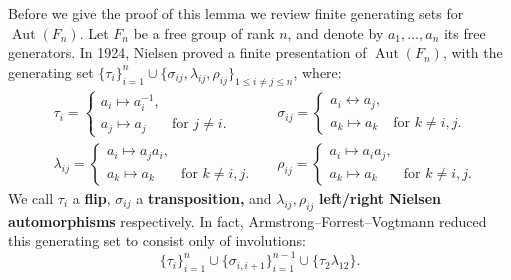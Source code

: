 \documentclass[11pt]{amsart}
\theoremstyle{plain}
\theoremstyle{definition}
\DeclareMathOperator{\Aut}{Aut}
\newcommand{\<}{\langle}
\renewcommand{\>}{\rangle}
\begin{document}
Before we give the proof of this lemma we review finite generating sets for $\Aut(F_{n})$. 
Let $F_n$ be a free group of rank $n$, and denote by $a_1,\ldots,a_n$ its free generators.
In 1924, Nielsen \cite{Nielsen1924} proved a finite presentation of $\Aut(F_n)$, with the
generating set $\{\tau_i\}_{i=1}^n \cup \{\sigma_{ij}, \lambda_{ij},
\rho_{ij}\}_{1 \le i \neq j \le n}$, where:
\begin{align*}
    &\tau_i=
    \begin{cases}
        a_i \mapsto a_i^{-1}, \\
        a_j \mapsto a_j & \text{for $j \neq i$.}
    \end{cases}
    &&\sigma_{ij}=
    \begin{cases}
        a_i \leftrightarrow a_j, \\
        a_k \mapsto a_k &\text{for $k \neq i,j$.}
    \end{cases}\\
    &\lambda_{ij}=
    \begin{cases}
        a_i \mapsto a_ja_i, \\
        a_k \mapsto a_k & \text{for $k \neq i,j$.}
    \end{cases}
    &&\rho_{ij}=
    \begin{cases}
        a_i\mapsto a_ia_j, \\
        a_k \mapsto a_k & \text{for $k \neq i,j$.}
    \end{cases}
\end{align*}
We call $\tau_i$ a \textbf{flip}, $\sigma_{ij}$ a
\textbf{transposition,} and $\lambda_{ij},\rho_{ij}$ \textbf{left/right Nielsen
  automorphisms} respectively. In fact, Armstrong--Forrest--Vogtmann \cite[Theorem 1]{AFV2008presentation}
reduced this generating set to consist only of involutions:
\begin{equation}\label{eqn:AFVgenset}
\{\tau_i\}_{i=1}^n
\cup \{\sigma_{i,i+1}\}_{i=1}^{n-1}\cup\{\tau_2\lambda_{12}\}. \tag{$\dagger$}
\end{equation}
\end{document}
